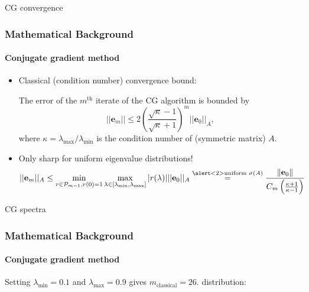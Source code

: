 \begin{frame}[label=background,fragile]{CG convergence}
    \frametitle{Mathematical Background}
    \framesubtitle{Conjugate gradient method}
    \begin{itemize}
        \item<1-> Classical (condition number) convergence bound:
        \begin{theorem}
            The error of the $m^{\text{th}}$ iterate of the CG algorithm is bounded by
            \begin{equation*}
            ||\mathbf{e}_m|| \leq 2 \left(\frac{\sqrt{\kappa}-1}{\sqrt{\kappa} + 1}\right)^m ||\mathbf{e}_0||_A,
            \end{equation*}
            where $\kappa = \lambda_{\text{max}}/\lambda_{\text{min}}$ is the condition number of (symmetric matrix) $A$.
        \end{theorem}
        \item<2-> Only sharp for \alert<2>{uniform} eigenvalue distributions!
        \begin{equation*}
            ||\mathbf{e}_m||_A \leq \min_{r \in \mathcal{P}_{m-1}, r(0) = 1} \max_{\lambda \in [\lambda_{\text{min}}, \lambda_{\text{max}}]} |r(\lambda)| ||\mathbf{e}_0||_A \overset{\alert<2>{\text{uniform } \sigma(A)}}{=} \frac{\|\mathbf{e}_0\|}{C_m\left(\frac{\kappa + 1}{\kappa - 1}\right)}
        \end{equation*}
    \end{itemize}
\end{frame}

\begin{frame}[label=background,fragile]{CG spectra}
    \frametitle{Mathematical Background}
    \framesubtitle{Conjugate gradient method}
    Setting $\lambda_{\text{min}} = 0.1$ and $\lambda_{\text{max}} = 0.9$ gives $m_{\text{classical}} = 26$.  distribution:
\end{frame}

